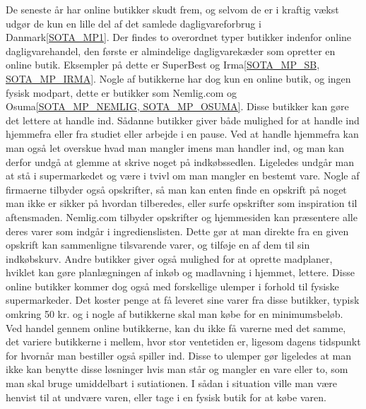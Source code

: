 De seneste år har online butikker skudt frem, og selvom de er i kraftig vækst udgør de kun en lille del af det samlede dagligvareforbrug i Danmark\ref{SOTA_MP1}.
Der findes to overordnet typer butikker indenfor online dagligvarehandel, den første er almindelige dagligvarekæder som opretter en online butik.
Eksempler på dette er SuperBest og Irma\ref{SOTA_MP_SB, SOTA_MP_IRMA}.
Nogle af butikkerne har dog kun en online butik, og ingen fysisk modpart, dette er butikker som Nemlig.com og Osuma\ref{SOTA_MP_NEMLIG, SOTA_MP_OSUMA}.
Disse butikker kan gøre det lettere at handle ind.
Sådanne butikker giver både mulighed for at handle ind hjemmefra eller fra studiet eller arbejde i en pause.
Ved at handle hjemmefra kan man også let overskue hvad man mangler imens man handler ind, og man kan derfor undgå at glemme at skrive noget på indkøbssedlen.
Ligeledes undgår man at stå i supermarkedet og være i tvivl om man mangler en bestemt vare.
Nogle af firmaerne tilbyder også opskrifter, så man kan enten finde en opskrift på noget man ikke er sikker på hvordan tilberedes, eller surfe opskrifter som inspiration til aftensmaden.
Nemlig.com tilbyder opskrifter og hjemmesiden kan præsentere alle deres varer som indgår i ingredienslisten.
Dette gør at man direkte fra en given opskrift kan sammenligne tilsvarende varer, og tilføje en af dem til sin indkøbskurv.
Andre butikker giver også mulighed for at oprette madplaner, hviklet kan gøre planlægningen af inkøb og madlavning i hjemmet, lettere.
Disse online butikker kommer dog også med forskellige ulemper i forhold til fysiske supermarkeder.
Det koster penge at få leveret sine varer fra disse butikker, typisk omkring 50 kr. og i nogle af butikkerne skal man købe for en minimumsbeløb.
Ved handel gennem online butikkerne, kan du ikke få varerne med det samme, det variere butikkerne i mellem, hvor stor ventetiden er, ligesom dagens tidspunkt for hvornår man bestiller også spiller ind.
Disse to ulemper gør ligeledes at man ikke kan benytte disse løsninger hvis man står og mangler en vare eller to, som man skal bruge umiddelbart i sutiationen.
I sådan i situation ville man være henvist til at undvære varen, eller tage i en fysisk butik for at købe varen.

